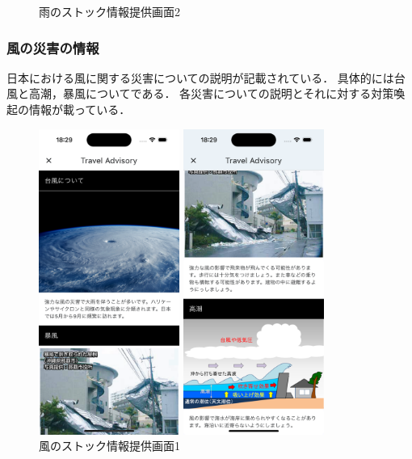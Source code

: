 \begin{figure}[H]
\begin{minipage}[b]{0.45\linewidth}
    \caption{雨のストック情報提供画面2}
    \label{fig:rain_stock_2}
  \end{minipage}
\end{figure}

\subsubsection {風の災害の情報}
日本における風に関する災害についての説明が記載されている．
具体的には台風と高潮，暴風についてである．
各災害についての説明とそれに対する対策喚起の情報が載っている．

\begin{figure}[H]
  \begin{minipage}[b]{0.45\linewidth}
    \centering
    \includegraphics[height=10cm]{./fig/wind_stock_1.png}
    \caption{風のストック情報提供画面1}
    \label{fig:rain_stock_1}
  \end{minipage}
  \begin{minipage}[b]{0.45\linewidth}
    \centering
    \includegraphics[height=10cm]{./fig/wind_stock_2.png}

\end{minipage}
\end{figure}
